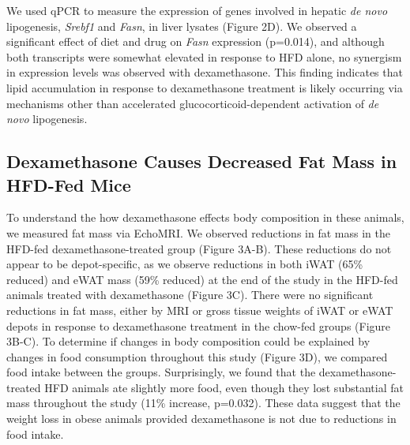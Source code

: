 \documentclass[11pt]{article} %
\begin{document}
We used qPCR to measure the expression of genes involved in hepatic
\emph{de novo} lipogenesis, \emph{Srebf1} and \emph{Fasn}, in liver
lysates (Figure 2D). We observed a significant effect of diet and drug
on \emph{Fasn} expression (p=0.014), and although both transcripts were
somewhat elevated in response to HFD alone, no synergism in expression
levels was observed with dexamethasone. This finding indicates that
lipid accumulation in response to dexamethasone treatment is likely
occurring via mechanisms other than accelerated glucocorticoid-dependent
activation of \emph{de novo} lipogenesis.

\subsection*{Dexamethasone Causes Decreased Fat Mass in HFD-Fed
Mice}\label{dexamethasone-causes-decreased-fat-mass-in-hfd-fed-mice}

To understand the how dexamethasone effects body composition in these
animals, we measured fat mass via EchoMRI. We observed reductions in fat
mass in the HFD-fed dexamethasone-treated group (Figure 3A-B). These
reductions do not appear to be depot-specific, as we observe reductions
in both iWAT (65\% reduced) and eWAT mass (59\% reduced) at the end of
the study in the HFD-fed animals treated with dexamethasone (Figure 3C).
There were no significant reductions in fat mass, either by MRI or gross
tissue weights of iWAT or eWAT depots in response to dexamethasone
treatment in the chow-fed groups (Figure 3B-C). To determine if changes
in body composition could be explained by changes in food consumption
throughout this study (Figure 3D), we compared food intake between the
groups. Surprisingly, we found that the dexamethasone-treated HFD
animals ate slightly more food, even though they lost substantial fat
mass throughout the study (11\% increase, p=0.032). These data suggest
that the weight loss in obese animals provided dexamethasone is not due
to reductions in food intake.
\end{document}
